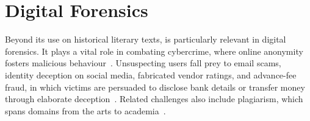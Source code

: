 \section{Digital Forensics}

Beyond its use on historical literary texts, \ai{} is particularly relevant in digital forensics.
It plays a vital role in combating cybercrime, where online anonymity fosters malicious behaviour~\citep{abbasi_writeprints_2008}.
Unsuspecting users fall prey to email scams, identity deception on social media, fabricated vendor ratings, and advance-fee fraud, in which victims are persuaded to disclose bank details or transfer money through elaborate deception~\citep{abbasi_writeprints_2008,neal_surveying_2018}.
Related challenges also include plagiarism, which spans domains from the arts to academia~\citep{neal_surveying_2018}.